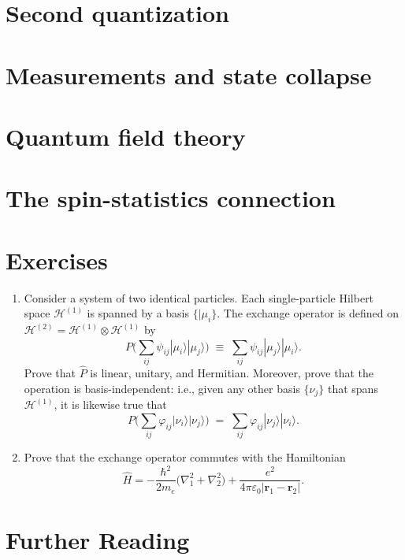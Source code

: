 \documentclass[pra,12pt]{revtex4}
\begin{document}
\section{Second quantization}

\section{Measurements and state collapse}

\section{Quantum field theory}
\label{sec:qft}

\section{The spin-statistics connection}
\label{sec:spinstats}

\section*{Exercises}

\begin{enumerate}
\item Consider a system of two identical particles.  Each
  single-particle Hilbert space $\mathscr{H}^{(1)}$ is spanned by a
  basis $\{|\mu_i\}$.  The exchange operator is defined on
  $\mathscr{H}^{(2)} = \mathscr{H}^{(1)} \otimes \mathscr{H}^{(1)}$ by
$$P \Big (\sum_{ij} \psi_{ij} |\mu_i\rangle|\mu_j\rangle \Big)
  \;\equiv\;  \sum_{ij} \psi_{ij} |\mu_j\rangle|\mu_i\rangle.$$
  Prove that $\hat{P}$ is linear, unitary, and Hermitian.  Moreover,
  prove that the operation is basis-independent: i.e., given any other
  basis $\{\nu_j\}$ that spans $\mathscr{H}^{(1)}$, it is likewise
  true that
$$P \Big (\sum_{ij} \varphi_{ij} |\nu_i\rangle|\nu_j\rangle \Big)
  \;=\;  \sum_{ij} \varphi_{ij} |\nu_j\rangle|\nu_i\rangle.$$
  \label{ex:1}

\item
  Prove that the exchange operator commutes with the Hamiltonian
$$\hat{H} = - \frac{\hbar^2}{2m_e} \Big(\nabla_1^2 + \nabla^2_2\Big) + \frac{e^2}{4\pi\varepsilon_0|\mathbf{r}_1 - \mathbf{r}_2|}.$$ \label{ex:2}
  
\end{enumerate}

\section*{Further Reading}

\end{document}

